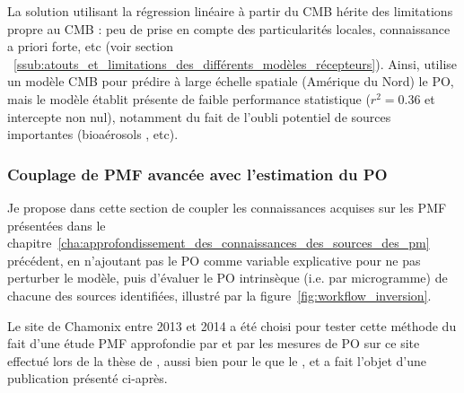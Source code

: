 La solution utilisant la régression linéaire à partir du CMB hérite des limitations
propre au CMB : peu de prise en compte des particularités locales, connaissance a priori
forte, etc (voir section
~\ref{ssub:atouts_et_limitations_des_différents_modèles_récepteurs}).
Ainsi, \cite{batesSource2018} utilise un modèle CMB pour prédire à large échelle spatiale
(Amérique du Nord) le PO, mais le modèle établit présente de faible performance
statistique ($r^2 = 0.36$ et intercepte non nul), notamment du fait de l'oubli potentiel de
sources importantes (bioaérosols \autocite{samakeUnexpected2017}, etc).

\subsubsection{Couplage de PMF avancée avec l'estimation du PO}%
\label{sub:couplage_de_pmf_avancée_avec_l_estimation_du_po}

Je propose dans cette section de coupler les connaissances acquises sur les PMF présentées
dans le chapitre~\ref{cha:approfondissement_des_connaissances_des_sources_des_pm}
précédent, en n'ajoutant pas le PO comme variable explicative pour ne pas perturber le
modèle, puis d'évaluer le PO intrinsèque (i.e. par microgramme) de chacune des sources
identifiées, illustré par la figure~\ref{fig:workflow_inversion}.

Le site de Chamonix entre 2013 et 2014 a été choisi pour tester cette méthode du fait
d'une étude PMF approfondie par \cite{chevrierChauffage2016} et par les mesures de PO sur
ce site effectué lors de la thèse de \cite{calasPollution2017}, aussi bien pour le \POAA{}
que le \PODTT, et a fait l'objet d'une publication présenté ci-après.

